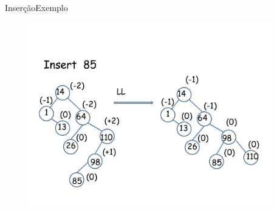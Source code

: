 \documentclass[aspectratio=169]{beamer}
\begin{document}
\begin{frame}{Inserção}{Exemplo}
\begin{figure}[!h]
  \centering
  \includegraphics[width=300pt]{imagens/exemplo_insercao3.png}
  \label{fig_exemplo_insercao3}
\end{figure}
\end{frame}

% 
\end{document}
